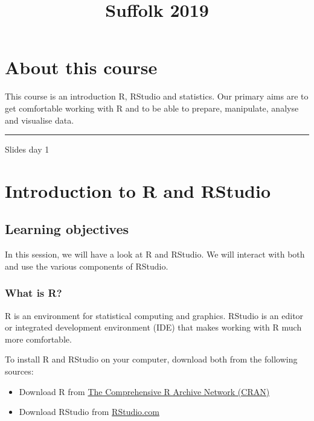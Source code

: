 \documentclass[]{article}
\title{Suffolk 2019}
\author{}
\date{}
\providecommand{\tightlist}{%
  \setlength{\itemsep}{0pt}\setlength{\parskip}{0pt}}
\begin{document}
\maketitle

{
\setcounter{tocdepth}{2}
\tableofcontents
}
\hypertarget{about-this-course}{%
\section*{About this course}\label{about-this-course}}

This course is an introduction R, RStudio and statistics. Our primary aims are to get comfortable working with R and to be able to prepare, manipulate, analyse and visualise data.

\begin{center}\rule{0.5\linewidth}{\linethickness}\end{center}

Slides day 1

\hypertarget{introduction-to-r-and-rstudio}{%
\section{Introduction to R and RStudio}\label{introduction-to-r-and-rstudio}}

\hypertarget{learning-objectives}{%
\subsection{Learning objectives}\label{learning-objectives}}

In this session, we will have a look at R and RStudio. We will interact with both and use the various components of RStudio.

\hypertarget{what-is-r}{%
\subsubsection{What is R?}\label{what-is-r}}

R is an environment for statistical computing and graphics. RStudio is an editor or integrated development environment (IDE) that makes working with R much more comfortable.

To install R and RStudio on your computer, download both from the following sources:

\begin{itemize}
\tightlist
\item
  Download R from \href{https://cran.r-project.org}{The Comprehensive R Archive Network (CRAN)}
\item
  Download RStudio from \href{https://www.rstudio.com}{RStudio.com}
\end{itemize}
\end{document}
